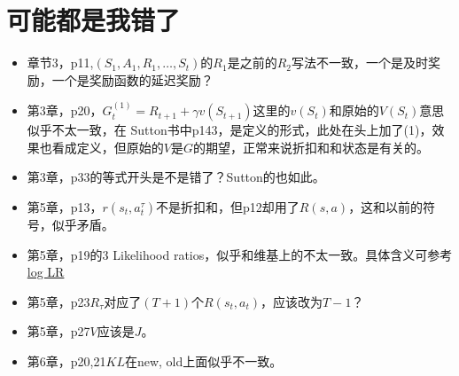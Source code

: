 \documentclass[UTF8]{ctexart}
\begin{document}
\section{可能都是我错了}
\label{sec:seemswrong}
\begin{itemize}
    \item 章节3，p11,$(S_1, A_1, R_1, \ldots, S_t)$的$R_1$是之前的$R_2$写法不一致，一个是及时奖励，一个是奖励函数的延迟奖励？
    \item 第3章，p20，$G_{t}^{(1)}=R_{t+1}+\gamma v(S_{t+1})$这里的$v(S_t)$和原始的$V(S_t)$意思似乎不太一致，在
    Sutton书中p143，是定义的形式，此处在头上加了(1)，效果也看成定义，但原始的$V$是$G$的期望，正常来说折扣和和状态是有关的。
    \item 第3章，p33的等式开头是不是错了？Sutton的也如此。
    \item 第5章，p13，$r(s_t, a_{t}^{\tau})$不是折扣和，但p12却用了$R(s, a)$，这和以前的符号，似乎矛盾。
    \item 第5章，p19的3 Likelihood ratios，似乎和维基上的不太一致。具体含义可参考\href{http://blog.shakirm.com/2015/11/machine-learning-trick-of-the-day-5-log-derivative-trick/}{log LR}
    \item 第5章，p23$R_{\tau}$对应了$(T+1)$个$R(s_t, a_t)$，应该改为$T-1$？
    \item 第5章，p27$V$应该是$J$。
    \item 第6章，p20,21$KL$在new, old上面似乎不一致。
\end{itemize}
\end{document}
